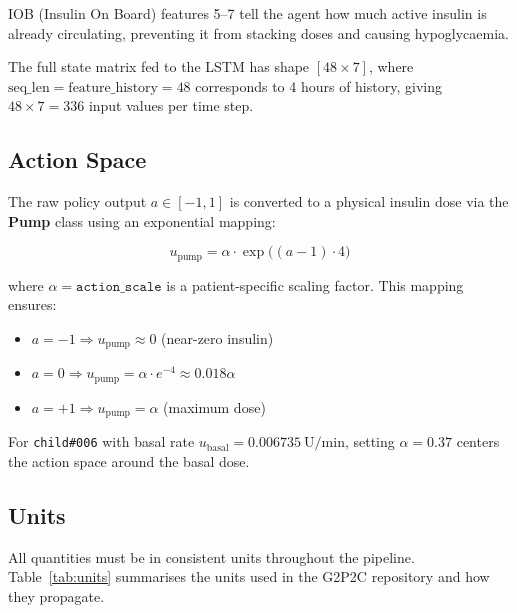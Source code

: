 \documentclass[11pt,a4paper]{article}
\begin{document}
IOB (Insulin On Board) features 5--7 tell the agent how much active insulin is already
circulating, preventing it from stacking doses and causing hypoglycaemia.

The full state matrix fed to the LSTM has shape $[48 \times 7]$,
where $\text{seq\_len} = \text{feature\_history} = 48$ corresponds to 4 hours of history,
giving $48 \times 7 = 336$ input values per time step.

\subsection{Action Space}

The raw policy output $a \in [-1, 1]$ is converted to a physical insulin dose via the
\textbf{Pump} class using an exponential mapping:

\begin{equation}
    u_\text{pump} = \alpha \cdot \exp\!\bigl((a - 1) \cdot 4\bigr)
    \label{eq:pump}
\end{equation}

where $\alpha = \texttt{action\_scale}$ is a patient-specific scaling factor. This mapping
ensures:
\begin{itemize}
    \item $a = -1 \Rightarrow u_\text{pump} \approx 0$ (near-zero insulin)
    \item $a = 0 \Rightarrow u_\text{pump} = \alpha \cdot e^{-4} \approx 0.018\alpha$
    \item $a = +1 \Rightarrow u_\text{pump} = \alpha$ (maximum dose)
\end{itemize}

For \texttt{child\#006} with basal rate $u_\text{basal} = 0.006735\ \text{U/min}$,
setting $\alpha = 0.37$ centers the action space around the basal dose.

\subsection{Units}

All quantities must be in consistent units throughout the pipeline. Table~\ref{tab:units}
summarises the units used in the G2P2C repository and how they propagate.
\end{document}

